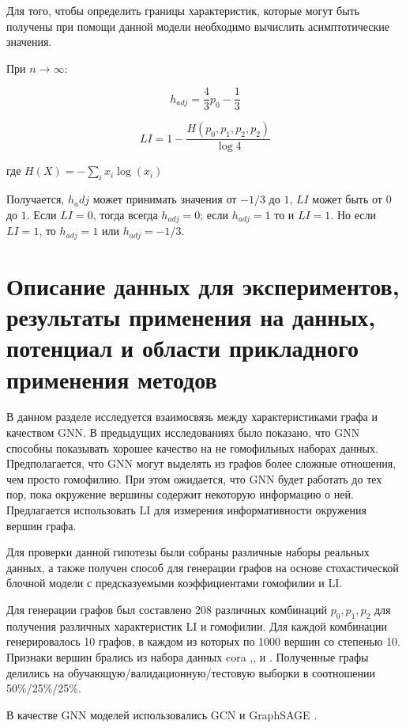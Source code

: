 \documentclass[a4paper,14pt]{article}
\begin{document}
	Для того, чтобы определить границы характеристик, которые могут быть получены при помощи данной модели необходимо вычислить асимптотические значения.
	
	При $n \rightarrow \infty$:
	
	$$h_{adj} = \dfrac{4}{3}p_0 - \dfrac{1}{3}$$
	
	$$LI = 1 - \dfrac{H(p_0,p_1,p_2,p_2)}{\log 4}$$
	
	где $H(X) = -\sum_ix_i\log(x_i)$
	
	Получается, $h_adj$ может принимать значения от $-1/3$ до $1$, $LI$ может быть от $0$ до $1$. Если $LI=0$, тогда всегда $h_{adj}=0$; если $h_{adj}=1$ то и $LI=1$.
	Но если $LI=1$, то $h_{adj}=1$ или $h_{adj}=-1/3$.
	
	\pagebreak
	\section{Описание данных для экспериментов, результаты применения на данных, потенциал и области прикладного применения методов}
	\setcounter{figure}{0}
	
	В данном разделе исследуется взаимосвязь между характеристиками графа и качеством GNN.
	В предыдущих исследованиях было показано, что GNN способны показывать хорошее качество на не гомофильных наборах данных.
	Предполагается, что GNN могут выделять из графов более сложные отношения, чем просто гомофилию.
	При этом ожидается, что GNN будет работать до тех пор, пока окружение вершины содержит некоторую информацию о ней.
	Предлагается использовать LI для измерения информативности окружения вершин графа.
	
	Для проверки данной гипотезы были собраны различные наборы реальных данных, а также получен способ для генерации графов на основе стохастической блочной модели с предсказуемыми коэффициентами гомофилии и LI.
	
	Для генерации графов был составлено 208 различных комбинаций $p_0,p_1,p_2$ для получения различных характеристик LI и гомофилии.
	Для каждой комбинации генерировалось 10 графов, в каждом из которых по 1000 вершин со степенью 10.
	Признаки вершин брались из набора данных cora \cite{mccallum2000automating},\cite{namata2012query},\cite{sen2008collective} и \cite{yang2016revisiting}.
	Полученные графы делились на обучающую/валидационную/тестовую выборки в соотношении 50\%/25\%/25\%.
	
	В качестве GNN моделей использовались GCN \cite{kipf2016semi} и GraphSAGE \cite{hamilton2017inductive}.
	
\end{document}
